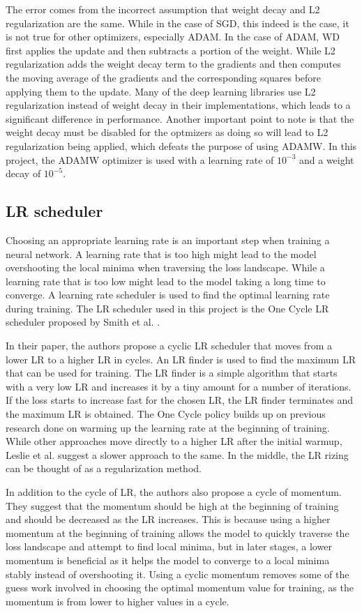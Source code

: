 The error comes from the incorrect assumption that weight decay and L2 regularization are the same. While in the case of SGD, this indeed is the case, it is not true for other optimizers, especially ADAM. In the case of ADAM, WD first applies the update and then subtracts a portion of the weight. While L2 regularization adds the weight decay term to the gradients and then computes the moving average of the gradients and the corresponding squares before applying them to the update. Many of the deep learning libraries use L2 regularization instead of weight decay in their implementations, which leads to a significant difference in performance. Another important point to note is that the weight decay must be disabled for the optmizers as doing so will lead to L2 regularization being applied, which defeats the purpose of using ADAMW.
In this project, the ADAMW optimizer is used with a learning rate of $10^{-3}$ and a weight decay of $10^{-5}$.

\subsection{LR scheduler}
Choosing an appropriate learning rate is an important step when training a neural network. A learning rate that is too high might lead to the model overshooting the local minima when traversing the loss landscape. While a learning rate that is too low might lead to the model taking a long time to converge. A learning rate scheduler is used to find the optimal learning rate during training. The LR scheduler used in this project is the One Cycle LR scheduler proposed by Smith et al. \cite{smithSuperConvergenceVeryFast2018}.

In their paper, the authors propose a cyclic LR scheduler that moves from a lower LR to a higher LR in cycles. An LR finder is used to find the maximum LR that can be used for training. The LR finder is a simple algorithm that starts with a very low LR and increases it by a tiny amount for a number of iterations. If the loss starts to increase fast for the chosen LR, the LR finder terminates and the maximum LR is obtained. 
The One Cycle policy builds up on previous research done on warming up the learning rate at the beginning of training. While other approaches move directly to a higher LR after the initial warmup, Leslie et al. suggest a slower approach to the same. In the middle, the LR rizing can be thought of as a regularization method.

In addition to the cycle of LR, the authors also propose a cycle of momentum. They suggest that the momentum should be high at the beginning of training and should be decreased as the LR increases. This is because using a higher momentum at the beginning of training allows the model to quickly traverse the loss landscape and attempt to find local minima, but in later stages, a lower momentum is beneficial as it helps the model to converge to a local minima stably instead of overshooting it. Using a cyclic momentum removes some of the guess work involved in choosing the optimal momentum value for training, as the momentum is from lower to higher values in a cycle. 

